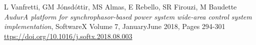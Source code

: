\documentclass[journal]{IEEEtran}
\begin{document}
\begin{thebibliography}{1}
 L Vanfretti, GM J\'{o}nsd\'{o}ttir, MS Almas, E Rebello, SR Firouzi, M Baudette \emph{Audur\textendash A platform for synchrophasor-based power system wide-area control system implementation}, SoftwareX Volume 7, January\textendash June 2018, Pages 294-301 \url{ttps://doi.org/10.1016/j.softx.2018.08.003}



\end{thebibliography}

% 

\end{document}
